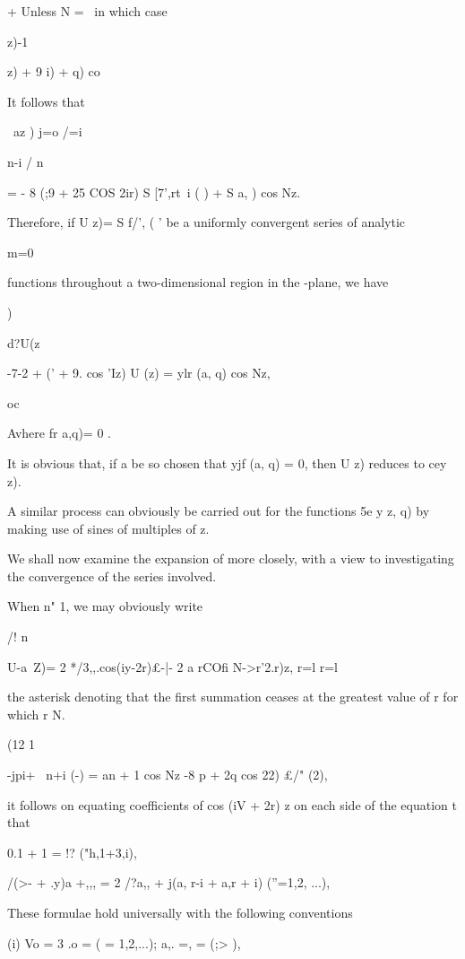 + Unless N = \, in which case \ \ \ \ {z)-1\ \ {z) + 9 i) + q) co%

%
%

It follows that

\ az ) j=o /=i

n-i / n \

= - 8 (;9 + 25 COS 2ir) S [7',rt\ i ( ) + S a, ) cos Nz.

Therefore, if U z)= S f/', ( ' be a uniformly convergent series of
analytic

m=0

functions throughout a two-dimensional region in the -plane, we have

)

d?U(z

-7-2 + (' + 9. cos 'Iz) U (z) = ylr (a, q) cos Nz,

oc

Avhere fr a,q)= 0 .

It is obvious that, if a be so chosen that yjf (a, q) = 0, then U z)
reduces to cey z).

A similar process can obviously be carried out for the functions 5e y
z, q) by making use of sines of multiples of z.


We shall now examine the expansion of more closely, with a view
to investigating the convergence of the series involved.

When n" 1, we may obviously write

/! n

U-a\ Z)= 2 */3,,.cos(iy-2r)£-|- 2 a rCOfi N->r'2.r)z, r=l r=l

the asterisk denoting that the first summation ceases at the greatest
value of r for which r N.

 (12 1

-jpi+ \ n+i (-) = an + 1 cos Nz -8 p + 2q cos 22) £/" (2),

it follows on equating coefficients of cos (iV + 2r) z on each side of
the equation t that

0.1 + 1 = !? ("h,1+3,i),

/(>- + .y)a +,,, = 2 /?a,, + j(a, r-i + a,r + i) (''=1,2, ...),

These formulae hold universally with the following conventions %

(i) Vo = 3 .o = ( = 1,2,...); a,. =, = (;> ),

}}
